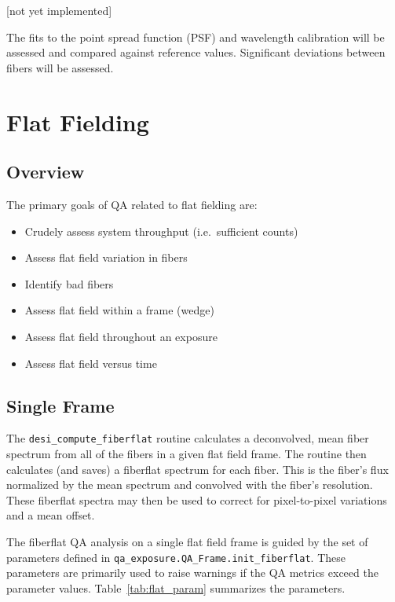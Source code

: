\documentclass[12pt]{article}
\newenvironment{myitemize}
{ \begin{itemize}
    \setlength{\itemsep}{0pt}
    \setlength{\parskip}{0pt}
    \setlength{\parsep}{0pt}     }
{ \end{itemize}                  }
\begin{document}
[not yet implemented]

The fits to the point spread function (PSF)
and wavelength calibration will be assessed
and compared against reference values.
Significant deviations between fibers will
be assessed.     


\section{Flat Fielding}

\subsection{Overview}

The primary goals of QA related to flat fielding are:

\begin{myitemize}
\item Crudely assess system throughput (i.e.\ sufficient counts)
\item Assess flat field variation in fibers
\item Identify bad fibers
\item Assess flat field within a frame (wedge) 
\item Assess flat field throughout an exposure
\item Assess flat field versus time
\end{myitemize}

\subsection{Single Frame}

The {\tt desi\_compute\_fiberflat} routine calculates a 
deconvolved, mean fiber spectrum from all of the fibers in a given 
flat field frame. 
The routine then calculates (and saves) a fiberflat spectrum for each 
fiber. This is the fiber's flux normalized by the mean spectrum 
and convolved with the fiber's resolution.  
These fiberflat spectra
may then be used to correct for pixel-to-pixel variations 
and a mean offset.

The fiberflat QA analysis on a single flat field frame 
is guided by the set of
parameters defined in {\tt qa\_exposure.QA\_Frame.init\_fiberflat}.
These parameters are primarily used 
to raise warnings if the QA metrics exceed the parameter values.
Table~\ref{tab:flat_param} summarizes the parameters.
\end{document}
